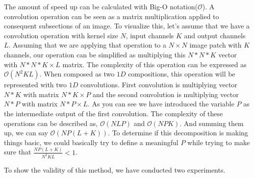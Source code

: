 The amount of speed up can be calculated with Big-O notation($\mathcal{O}$). A convolution operation can be seen as a matrix multiplication applied to consequent subsections of an image. To visualize this, let's assume that we have a convolution operation with kernel size $N$, input channels $K$ and output channels $L$. Assuming that we are applying that operation to a $N \times N$ image patch with $K$ channels, our operation can be simplified as multiplying this $N*N*K$ vector with $N*N*K \times L$ matrix. The complexity of this operation can be expressed as $\mathcal{O}(N^2KL)$. When composed as two $1D$ compositions, this operation will be represented with two $1D$ convolutions. First convolution is multiplying vector $N*K$ with matrix $N*K \times P$ and the second convolution is multiplying vector $N*P$ with matrix $N*P \times L$. As you can see we have introduced the variable $P$ as the intermediate output of the first convolution. The complexity of these operations can be described as, $\mathcal{O}(NLP)$ and $\mathcal{O}(NPK)$. And summing them up, we can say $\mathcal{O}(NP(L + K))$. To determine if this decomposition is making things basic, we could basically try to define a meaningful $P$ while trying to make sure that $\frac{NP(L+K)}{N^2KL} < 1$.

To show the validity of this method, we have conducted two experiments. 
